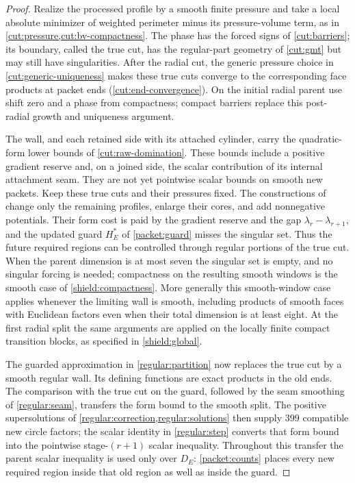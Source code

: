\begin{proof}
Realize the processed profile by a smooth finite pressure and take a
local absolute minimizer of weighted perimeter minus its pressure-volume
term, as in \cref{cut:pressure,cut:bv-compactness}. The phase has the
forced signs of \cref{cut:barriers}; its boundary, called the true cut,
has the regular-part geometry of \cref{cut:gmt} but may still have
singularities. After the
radial cut, the generic pressure choice in
\cref{cut:generic-uniqueness} makes these true cuts converge to the
corresponding face products at packet ends
(\cref{cut:end-convergence}). On the initial radial parent use shift
zero and a phase from compactness; compact barriers replace this
post-radial growth and uniqueness argument.

The wall, and each retained side with its attached cylinder,
carry the quadratic-form lower bounds of \cref{cut:raw-domination}.
These bounds include a positive gradient reserve and, on a joined
side, the scalar contribution of its internal attachment seam.
They are not yet pointwise scalar bounds on smooth new packets.
Keep these true cuts and their pressures fixed. The constructions of
 change only the remaining
profiles, enlarge their cores, and add nonnegative potentials. Their
form cost is paid by the gradient reserve and the gap
$\lambda_r-\lambda_{r+1}$, and the updated guard $H_E^*$ of
\eqref{packet:guard} misses the singular set. Thus the future required
regions can be controlled through regular portions of the true cut.
When the parent dimension is at most seven the
singular set is empty, and no singular forcing is needed; compactness on
the resulting smooth windows is the smooth case of
\cref{shield:compactness}. More generally this smooth-window case applies
whenever the limiting wall is smooth, including products of smooth faces
with Euclidean factors even when their total dimension is at least eight.
At the first radial split the same arguments
are applied on the locally finite compact transition blocks, as specified
in \cref{shield:global}.

The guarded approximation in \cref{regular:partition} now replaces
the true cut by a smooth regular wall. Its defining functions are
exact products in the old ends. The comparison with the true cut on
the guard, followed by the seam smoothing of \cref{regular:seam},
transfers the form bound to the smooth split. The positive
supersolutions of \cref{regular:correction,regular:solutions}
then supply $399$ compatible new circle factors; the scalar identity
in \cref{regular:step} converts that form bound into the pointwise
stage-$(r+1)$ scalar inequality. Throughout this transfer the parent
scalar inequality is used only over $D_E$: \cref{packet:counts}
places every new required region inside that old region as well as
inside the guard.


\end{proof}

